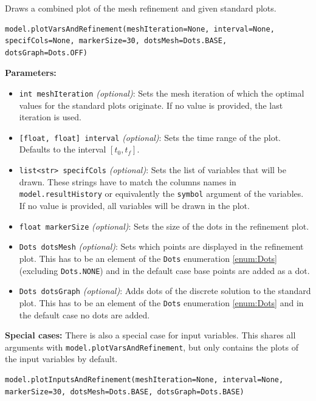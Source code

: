 \documentclass[12pt]{article}
\begin{document}
\begin{mdframed}[backgroundcolor=gray!10, roundcorner=10pt,
		linewidth=1pt]
	
	Draws a combined plot of the mesh refinement and given standard plots.
 
	\begin{lstlisting}
model.plotVarsAndRefinement(meshIteration=None, interval=None, specifCols=None, markerSize=30, dotsMesh=Dots.BASE, dotsGraph=Dots.OFF)
		\end{lstlisting}
	\label{plotVarsAndRefinement}
	\textbf{Parameters:}
	\begin{itemize}
		\item \texttt{int meshIteration} \emph{(optional)}: Sets the mesh iteration of which the optimal values for the standard plots originate. If no value is provided, the last iteration is used.

		\item \texttt{[float, float] interval} \emph{(optional)}: Sets the time range of the plot. Defaults to the interval $[t_0, t_f]$.
		
		\item \texttt{list<str> specifCols} \emph{(optional)}: Sets the list of variables that will be drawn. These strings have to match the columns names in \texttt{model.resultHistory} or equivalently the \texttt{symbol} argument of the variables. If no value is provided, all variables will be drawn in the plot.

		\item \texttt{float markerSize} \emph{(optional)}: Sets the size of the dots in the refinement plot.		

		\item \texttt{Dots dotsMesh} \emph{(optional)}: Sets which points are displayed in the refinement plot. This has to be an element of the \texttt{Dots} enumeration \eqref{enum:Dots} (excluding \texttt{Dots.NONE}) and in the default case base points are added as a dot.
		
		\item \texttt{Dots dotsGraph} \emph{(optional)}: Adds dots of the discrete solution to the standard plot. This has to be an element of the \texttt{Dots} enumeration \eqref{enum:Dots} and in the default case no dots are added.
	\end{itemize}
	
	\textbf{Special cases:}
		There is also a special case for input variables. This shares all arguments with \texttt{model.plotVarsAndRefinement}, but only contains the plots of the input variables by default.
		\begin{lstlisting}
model.plotInputsAndRefinement(meshIteration=None, interval=None, markerSize=30, dotsMesh=Dots.BASE, dotsGraph=Dots.BASE)    
		\end{lstlisting}
			

\end{mdframed}
\end{document}
